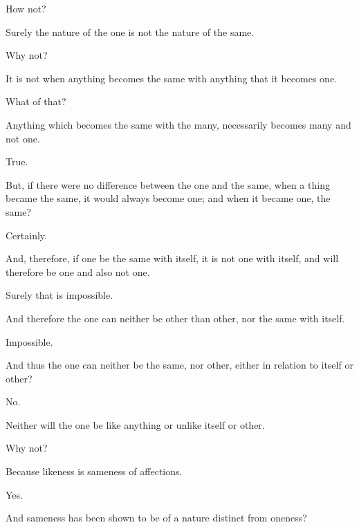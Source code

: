 \documentclass[11pt,letter]{article}
\begin{document}
\par  How not?

\par  Surely the nature of the one is not the nature of the same.

\par  Why not?

\par  It is not when anything becomes the same with anything that it becomes one.

\par  What of that?

\par  Anything which becomes the same with the many, necessarily becomes many and not one.

\par  True.

\par  But, if there were no difference between the one and the same, when a thing became the same, it would always become one; and when it became one, the same?

\par  Certainly.

\par  And, therefore, if one be the same with itself, it is not one with itself, and will therefore be one and also not one.

\par  Surely that is impossible.

\par  And therefore the one can neither be other than other, nor the same with itself.

\par  Impossible.

\par  And thus the one can neither be the same, nor other, either in relation to itself or other?

\par  No.

\par  Neither will the one be like anything or unlike itself or other.

\par  Why not?

\par  Because likeness is sameness of affections.

\par  Yes.

\par  And sameness has been shown to be of a nature distinct from oneness?
\end{document}
